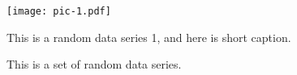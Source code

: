 \documentclass{article}
\begin{document}
	\begin{figure}
		\centering
		\texttt{[image: pic-1.pdf]}
		\caption{This is a random data series 1, and here is short caption.}
		\vspace{-30em}
	\end{figure}

	\begin{figure}
		\def\CE{0.20}
		\centering
		\hfill
		\hfill
		\hfill
		\captionsetup{type=figure,name=Fig.,justification=raggedright,singlelinecheck=false}
		\caption{This is a set of random data series.}
		\label{fig}
	\end{figure}
\end{document}
